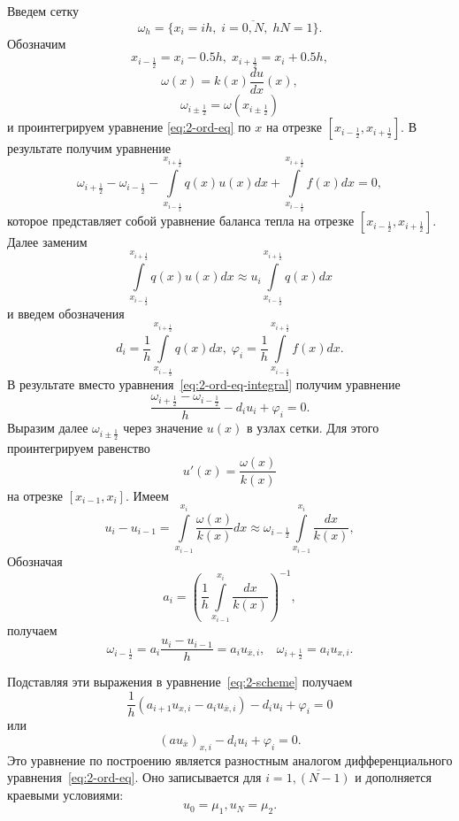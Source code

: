 \documentclass[11pt,a4paper,twoside]{report}
\numberwithin{equation}{section}
\theoremstyle{definition}
\theoremstyle{plain}
\begin{document}
Введем сетку
%
$$
    \omega_h = \{ x_i = ih,\;i = \overline{0, N},\;hN = 1\}.
$$
%
Обозначим
%
$$
    x_{i-\frac12} = x_i - 0.5h,\;x_{i+\frac12} = x_i + 0.5h,
$$
%
%
$$
    \omega(x) = k(x)\frac{du}{dx}(x),
$$
%
%
$$
    \omega_{i \pm \frac12} = \omega(x_{i \pm \frac12})
$$
%
и проинтегрируем уравнение \eqref{eq:2-ord-eq} по $x$ на отрезке $[x_{i-\frac12},
x_{i+\frac12}]$. В результате получим уравнение
%
\begin{equation}
    \label{eq:2-ord-eq-integral}
    \omega_{i+\frac12} - \omega_{i-\frac12} -
    \int\limits_{x_{i-\frac12}}^{x_{i+\frac12}} q(x)u(x)dx +
    \int\limits_{x_{i-\frac12}}^{x_{i+\frac12}} f(x)dx = 0,
\end{equation}
%
которое представляет собой уравнение баланса тепла на отрезке
$[x_{i-\frac12}, x_{i+\frac12}]$.
Далее заменим
%
$$
    \int\limits_{x_{i-\frac12}}^{x_{i+\frac12}} q(x)u(x)dx \approx
    u_i\int\limits_{x_{i-\frac12}}^{x_{i+\frac12}} q(x)dx
$$
%
и введем обозначения
%
\begin{equation}
    \label{eq:2-ord-eq-def}
    d_i = \frac{1}{h}\int\limits_{x_{i-\frac12}}^{x_{i+\frac12}} q(x)dx,\;
    \varphi_i = \frac{1}{h}\int\limits_{x_{i-\frac12}}^{x_{i+\frac12}} f(x)dx.
\end{equation}
%
В результате вместо уравнения~\eqref{eq:2-ord-eq-integral} получим уравнение
%
\begin{equation}
    \label{eq:2-scheme}
    \dfrac{\omega_{i+\frac12} - \omega_{i-\frac12}}{h} - d_iu_i+\varphi_i=0.
%
\end{equation}
%
Выразим далее $\omega_{i \pm \frac12}$ через значение $u(x)$
в узлах сетки. Для этого проинтегрируем равенство
%
$$
    u'(x) = \dfrac{\omega(x)}{k(x)}
$$
%
на отрезке $[x_{i-1}, x_i]$. Имеем
%
$$
    u_i-u_{i-1} = \int\limits_{x_{i-1}}^{x_i}\dfrac{\omega(x)}{k(x)}dx
        \approx \omega_{i-\frac12}\int\limits_{x_{i-1}}^{x_i}\dfrac{dx}{k(x)},
$$
%
Обозначая
%
\begin{equation}
    \label{eq:2_lab_a_i}
    a_i = \left(\dfrac1h \int\limits_{x_{i-1}}^{x_i}\dfrac{dx}{k(x)}\right)^{-1},
%
\end{equation}
%
получаем
%
$$
    \omega_{i-\frac12}=a_i\dfrac{u_i-u_{i-1}}{h}
    =a_iu_{\overline{x},i},~~~~\omega_{i+\frac12}=a_iu_{x,i}.
$$
%

Подставляя эти выражения в уравнение~\eqref{eq:2-scheme}
получаем
%
$$
    \dfrac1h(a_{i+1}u_{x,i}-a_iu_{\overline{x},i})-d_iu_i+\varphi_i=0
$$
%
или
%
\begin{equation}
    \label{eq:2_diff_eq}
    (au_{\overline{x}})_{x,i}-d_iu_i+\varphi_i=0.
%
\end{equation}
%
Это уравнение по построению является разностным аналогом
дифференциального уравнения~\eqref{eq:2-ord-eq}. Оно
записывается для $i=\overline{1, (N-1)}$ и дополняется
краевыми условиями:
%
\begin{equation}
    \label{eq:2_diff_eq_start}
    u_0=\mu_1, u_N=\mu_2.
%
\end{equation}
%
\end{document}
